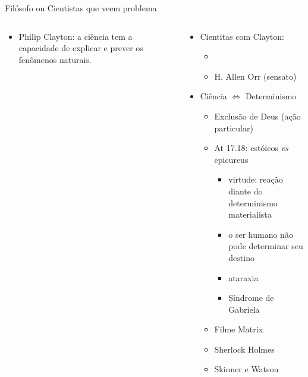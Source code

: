 \begin{frame}{Filósofo ou Cientistas que veem problema}
 \begin{columns}
  \begin{column}{0.45\textwidth}
   \begin{itemize}
    \justifying
    \item<2-3,8-14>[$\bullet$] \textcolor{NordBrightCyan}{Philip Clayton}: a ciência 
     tem a capacidade de explicar e prever os fenômenos naturais.
   \end{itemize}
   \vspace{0.5cm}
   \centering
  \end{column}
  \begin{column}{0.55\textwidth}
   \begin{itemize}
    \item<3-> Cientitas com Clayton: 
     \begin{itemize}
      \item<4->  
      \item<7-> H. Allen Orr (sensato)
     \end{itemize}
    \item<8-|alert@8> Ciência $\Longleftrightarrow$ \textcolor{NordYellow}{Determinismo}
     \begin{itemize}
      \item<9-> Exclusão de Deus (ação particular)
      \item<10-> At 17.18: estóicos \textit{vs} epicureus
       \begin{itemize}
        \item<11-> virtude: reação diante do determinismo materialista
        \item<12-> o ser humano não pode determinar seu destino
        \item<13-> ataraxia
        \item<14-> Síndrome de Gabriela
       \end{itemize}
      \item<15-> Filme Matrix
      \item<16-> Sherlock Holmes
      \item<17-> Skinner e Watson
     \end{itemize}
   \end{itemize}
  \end{column}
 \end{columns}
\end{frame}

